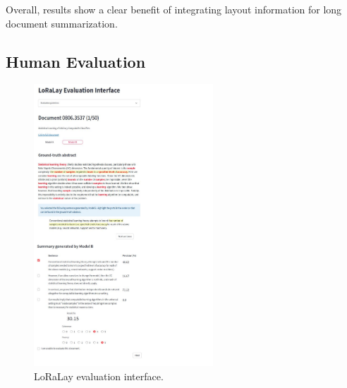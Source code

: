 Overall, results show a clear benefit of integrating layout information for long document summarization. 

\subsection{Human Evaluation}

\begin{figure}[H]
    \hspace{5cm}
    \centering
    \includegraphics[width=0.6\textwidth]{images/chapter5/interface_preview.pdf}
  \caption{LoRaLay evaluation interface.}
  \label{fig:chapter5-loralay-eval-interface}
\end{figure}


